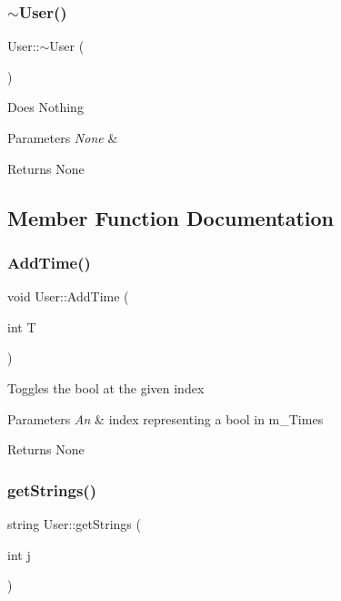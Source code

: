 \subsubsection{\texorpdfstring{$\sim$\+User()}{~User()}}
{\footnotesize\ttfamily User\+::$\sim$\+User (\begin{DoxyParamCaption}{ }\end{DoxyParamCaption})}

Does Nothing 
\begin{DoxyParams}{Parameters}
{\em None} & \\
\hline
\end{DoxyParams}
\begin{DoxyReturn}{Returns}
None 
\end{DoxyReturn}


\subsection{Member Function Documentation}
\mbox{\label{class_user_a3a637aa0a7a7b37885f2cd7dc77ecd99}} 
\subsubsection{\texorpdfstring{Add\+Time()}{AddTime()}}
{\footnotesize\ttfamily void User\+::\+Add\+Time (\begin{DoxyParamCaption}\item[{int}]{T }\end{DoxyParamCaption})}

Toggles the bool at the given index 
\begin{DoxyParams}{Parameters}
{\em An} & index representing a bool in m\+\_\+\+Times \\
\hline
\end{DoxyParams}
\begin{DoxyReturn}{Returns}
None 
\end{DoxyReturn}
\mbox{\label{class_user_a3b0b9cf712efbb632f920a4cc5f18925}} 
\subsubsection{\texorpdfstring{get\+Strings()}{getStrings()}}
{\footnotesize\ttfamily string User\+::get\+Strings (\begin{DoxyParamCaption}\item[{int}]{j }\end{DoxyParamCaption})}

